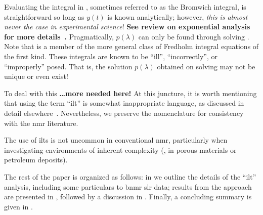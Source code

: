 Evaluating the integral in , sometimes referred to as the Bromwich integral, is straightforward so long as $y(t)$ is known analytically;
however, \emph{this is almost never the case in experimental science}!
\textbf{See review on exponential analysis for more details~\cite{1999-Istratov-RSI-70-1233}.}
Pragmatically, $p ( \lambda )$ can only be found through solving .
Note that  is a member of the more general class of Fredholm integral equations of the first kind.
These integrals are known to be ``ill'', ``incorrectly'', or ``improperly'' posed.
That is, the solution $p ( \lambda )$ obtained on solving  may not be unique or even exist!

To deal with this \textbf{\dots more needed here!}
At this juncture, it is worth mentioning that using the term ``\gls{ilt}'' is somewhat inappropriate language, as discussed in detail elsewhere~\cite{2017-Fordham-DF-29-2}.
Nevertheless, we preserve the nomenclature for consistency with the \gls{nmr} literature.



The use of \glspl{ilt} is not uncommon in conventional \gls{nmr}, particularly when investigating environments of inherent complexity (, in porous materials or petroleum deposits).




The rest of the paper is organized as follows:
in  we outline the details of the ``\gls{ilt}'' analysis, including some particulars to \gls{bnmr} \gls{slr} data;
results from the approach are presented in ,
followed by a discussion in .
Finally, a concluding summary is given in .
